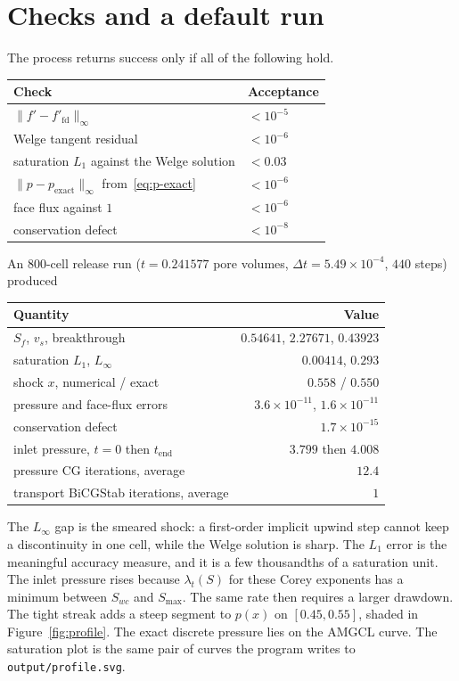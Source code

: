 \documentclass[11pt]{article}
\begin{document}
\section{Checks and a default run}

The process returns success only if all of the following hold.
\begin{center}
\begin{tabular}{@{}ll@{}}
\toprule
Check & Acceptance \\
\midrule
$\|f' - f'_{\mathrm{fd}}\|_\infty$ & $< 10^{-5}$ \\
Welge tangent residual & $< 10^{-6}$ \\
saturation $L_1$ against the Welge solution & $< 0.03$ \\
$\|p - p_{\mathrm{exact}}\|_\infty$ from~\eqref{eq:p-exact} & $< 10^{-6}$ \\
face flux against $1$ & $< 10^{-6}$ \\
conservation defect & $< 10^{-8}$ \\
\bottomrule
\end{tabular}
\end{center}
An $800$-cell release run ($t = 0.241577$ pore volumes, $\Delta t = 5.49\times 10^{-4}$, $440$ steps) produced
\begin{center}
\begin{tabular}{@{}lr@{}}
\toprule
Quantity & Value \\
\midrule
$S_f$, $v_s$, breakthrough & $0.54641$, $2.27671$, $0.43923$ \\
saturation $L_1$, $L_\infty$ & $0.00414$, $0.293$ \\
shock $x$, numerical / exact & $0.558$ / $0.550$ \\
pressure and face-flux errors & $3.6\times 10^{-11}$, $1.6\times 10^{-11}$ \\
conservation defect & $1.7\times 10^{-15}$ \\
inlet pressure, $t=0$ then $t_{\mathrm{end}}$ & $3.799$ then $4.008$ \\
pressure CG iterations, average & $12.4$ \\
transport BiCGStab iterations, average & $1$ \\
\bottomrule
\end{tabular}
\end{center}
The $L_\infty$ gap is the smeared shock: a first-order implicit upwind step cannot keep a discontinuity in one cell, while the Welge solution is sharp.
The $L_1$ error is the meaningful accuracy measure, and it is a few thousandths of a saturation unit.
The inlet pressure rises because $\lambda_t(S)$ for these Corey exponents has a minimum between $S_{wc}$ and $S_{\max}$.
The same rate then requires a larger drawdown.
The tight streak adds a steep segment to $p(x)$ on $[0.45, 0.55]$, shaded in Figure~\ref{fig:profile}.
The exact discrete pressure lies on the AMGCL curve.
The saturation plot is the same pair of curves the program writes to \texttt{output/profile.svg}.
\end{document}
